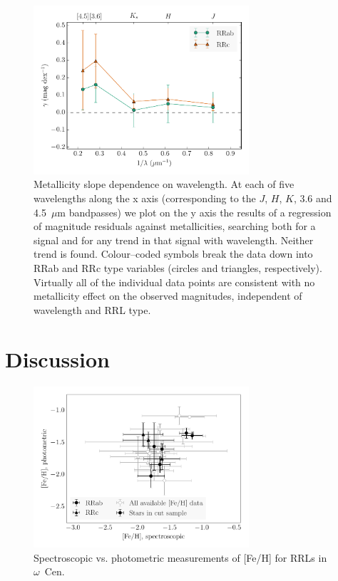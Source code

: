 \documentclass[a4paper,fleqn,usenatbib]{mnras}
\newcommand{\ocen}{$\omega$~Cen\xspace}
\newcommand{\um}{~$\mu$m\xspace}
\begin{document}
\begin{figure}
\begin{center}
\includegraphics[width=80mm, trim=0.75cm 0 0.5cm 0]{../ocen_only_fitting/final_plots/metallicity_slope_vs_wavelength.pdf}
\caption{Metallicity slope dependence on wavelength. At each of five
wavelengths along the x axis (corresponding to the $J$, $H$, $K$, 3.6 and 
4.5\um bandpasses) we plot on the y axis the results of a
regression of magnitude residuals against metallicities, searching
both for a signal and for any trend in that signal with
wavelength. Neither trend is found. Colour--coded symbols break the data
down into RRab and RRc type variables (circles and triangles,
respectively).
Virtually all of the individual data points are consistent with no
metallicity effect on the observed magnitudes, independent of
wavelength and RRL type.}
\label{fig:metallicity_slopes}
\end{center}
\end{figure}

\section{Discussion}
\label{sec:discussion}

\begin{figure}
\begin{center}
\includegraphics[width=80mm]{../reworked_fitting_code/final_plots/metallicity_comparison_all_clipped.pdf}
\caption{Spectroscopic vs. photometric measurements of [Fe/H] for RRLs in \ocen.}
\label{fig:metallicity_comparison}
\end{center}
\end{figure}
\end{document}
